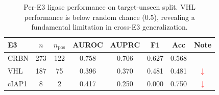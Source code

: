 \begin{table}[t]
\centering
\caption{Per-E3 ligase performance on target-unseen split. VHL performance is below random chance (0.5), revealing a fundamental limitation in cross-E3 generalization.}
\label{tab:per_e3_breakdown}
\scriptsize
\setlength{\tabcolsep}{3pt}
\begin{tabular}{@{}lccccccc@{}}
\toprule
\textbf{E3} & \textbf{$n$} & \textbf{$n_{\text{pos}}$} & \textbf{AUROC} & \textbf{AUPRC} & \textbf{F1} & \textbf{Acc} & \textbf{Note} \\
\midrule
CRBN & 273 & 122 & 0.758 & 0.706 & 0.627 & 0.568 &  \\
VHL & 187 & 75 & 0.396 & 0.370 & 0.481 & 0.481 & \textcolor{red}{$\downarrow$} \\
cIAP1 & 8 & 2 & 0.417 & 0.250 & 0.000 & 0.750 & \textcolor{red}{$\downarrow$} \\
\bottomrule
\end{tabular}
\end{table}
